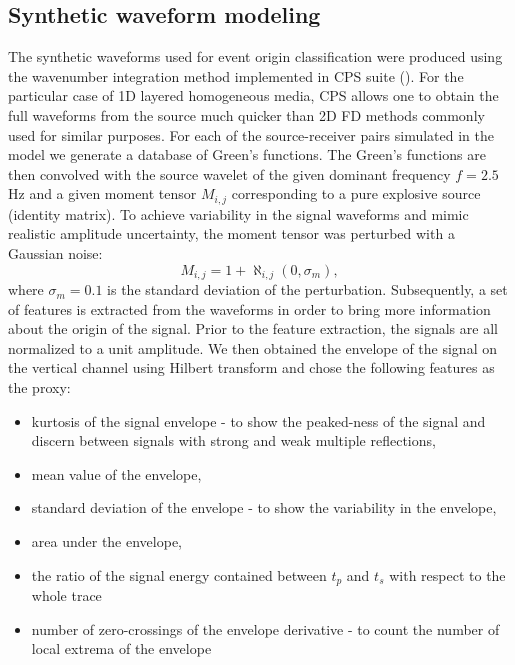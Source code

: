 \documentclass[letterpaper,11pt]{article}
\begin{document}
\subsection*{Synthetic waveform modeling}
The synthetic waveforms used for event origin classification were produced using the wavenumber integration method implemented in CPS suite (\cite{herrmann_computer_2013}). For the particular case of 1D layered homogeneous media, CPS allows one to obtain the full waveforms from the source much quicker than 2D FD methods commonly used for similar purposes. For each of the source-receiver pairs simulated in the model we generate a database of Green's functions. The Green's functions are then convolved with the source wavelet of the given dominant frequency $f=2.5$ Hz and a given moment tensor $M_{i,j}$ corresponding to a pure explosive source (identity matrix). To achieve variability in the signal waveforms and mimic realistic amplitude uncertainty, the moment tensor was perturbed with a Gaussian noise:
\begin{equation}
 M_{i,j} = 1 + \aleph_{i,j}(0,\sigma_{m}),
\end{equation}
where $\sigma_{m} = 0.1$ is the standard deviation of the perturbation. Subsequently, a set of features is extracted from the waveforms in order to bring more information about the origin of the signal. Prior to the feature extraction, the signals are all normalized to a unit amplitude. We then obtained the envelope of the signal on the vertical channel using Hilbert transform and chose the following features as the proxy:
\begin{itemize}
 \item kurtosis of the signal envelope - to show the peaked-ness of the signal and discern between signals with strong and weak multiple reflections,
 \item mean value of the envelope,
 \item standard deviation of the envelope - to show the variability in the envelope,
 \item area under the envelope,
 \item the ratio of the signal energy contained between $t_{p}$ and $t_{s}$ with respect to the whole trace
 \item number of zero-crossings of the envelope derivative - to count the number of local extrema of the envelope
\end{itemize}
\end{document}
